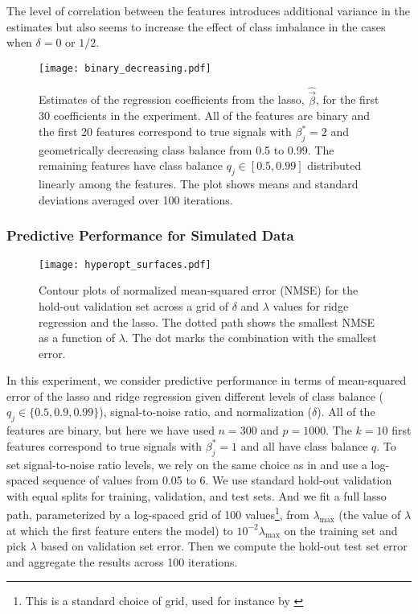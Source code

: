 The level of correlation between the features introduces additional variance in the
estimates but also seems to increase the effect of class imbalance in the cases when
\(\delta = 0\) or \(1/2\).

\begin{figure}[htpb]
  \centering
  \texttt{[image: binary\_decreasing.pdf]}
  \caption{%
    Estimates of the regression coefficients from the lasso, \(\hat{\vec{\beta}}\), for the
    first 30 coefficients in the experiment. All of the features are binary and the first 20
    features correspond to true signals with \(\beta_j^* = 2\) and geometrically decreasing
    class balance from 0.5 to 0.99. The remaining features have class balance \(q_j \in [0.5,
      0.99]\) distributed linearly among the features. The plot shows means and standard
    deviations averaged over 100 iterations.
  }
  \label{fig:binary-decreasing-full}
\end{figure}

\subsubsection{Predictive Performance for Simulated Data}%
\label{sec:predictive-performance-simulated}

\begin{figure}[htpb]
  \centering
  \texttt{[image: hyperopt\_surfaces.pdf]}
  \caption{%
    Contour plots of normalized mean-squared error (NMSE) for the hold-out validation set
    across a grid of \(\delta\) and \(\lambda\) values for ridge regression and the lasso. The
    dotted path shows the smallest NMSE as a function of \(\lambda\). The dot marks the
    combination with the smallest error.
  }
  \label{fig:hyperopt-contours-full}
\end{figure}

In this experiment, we consider predictive performance in terms of mean-squared error of
the lasso and ridge regression given different levels of class balance (\(q_j \in \{0.5,
0.9, 0.99\}\)), signal-to-noise ratio, and normalization (\(\delta\)). All of the features
are binary, but here we have used \(n=300\) and \(p = \num{1000}\). The \(k=10\) first
features correspond to true signals with \(\beta^*_j = 1\) and all have class balance
\(q\). To set signal-to-noise ratio levels, we rely on the same choice as in
\citet{hastie2020} and use a log-spaced sequence of values from 0.05 to 6. We use standard
hold-out validation with equal splits for training, validation, and test sets. And we fit a
full lasso path, parameterized by a log-spaced grid of 100 values\footnote{This is a
  standard choice of grid, used for instance by \citet{friedman2010}}, from
\(\lambda_\text{max}\) (the value of \(\lambda\) at which the first feature enters the
model) to \(10^{-2}\lambda_\text{max}\) on the training set and pick \(\lambda\) based on
validation set error. Then we compute the hold-out test set error and aggregate the results
across 100 iterations.

